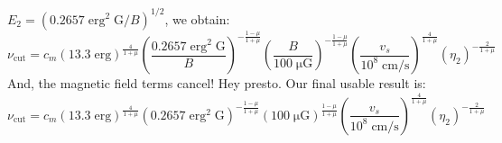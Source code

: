 \documentclass[iop, apj, numberedappendix]{emulateapj}
\newcommand*{\mt}{\mathrm}
\newcommand*{\unit}[1]{\;\mt{#1}}  %
\newcommand*{\mE}{m_\mt{E}}
\newcommand*{\muG}{\unit{\mu G}}
\begin{document}
$E_2 = \left( 0.2657 \unit{erg^2\;G} / B \right)^{1/2}$, we obtain:
\[
    \nu_{\mt{cut}} = c_m
        \left( 13.3 \unit{erg} \right)^{\frac{4}{1+\mu}}
        \left( \frac{0.2657 \unit{erg^2\;G}}{B} \right)^{-\frac{1-\mu}{1+\mu}}
        \left( \frac{B}{100\muG} \right)^{-\frac{1-\mu}{1+\mu}}
        \left( \frac{v_s}{10^8 \unit{cm/s}} \right)^{\frac{4}{1+\mu}}
        \left( \eta_2 \right)^{-\frac{2}{1+\mu}}
\]
And, the magnetic field terms cancel!  Hey presto.
Our final usable result is:
\begin{equation}
    \nu_{\mt{cut}} = c_m
        \left( 13.3 \unit{erg} \right)^{\frac{4}{1+\mu}}
        \left( 0.2657 \unit{erg^2\;G} \right)^{-\frac{1-\mu}{1+\mu}}
        \left( 100 \muG \right)^{\frac{1-\mu}{1+\mu}}
        \left( \frac{v_s}{10^8 \unit{cm/s}} \right)^{\frac{4}{1+\mu}}
        \left( \eta_2 \right)^{-\frac{2}{1+\mu}}
\end{equation}

%
%
%
%    
%
%    
%
%    



\end{document}
